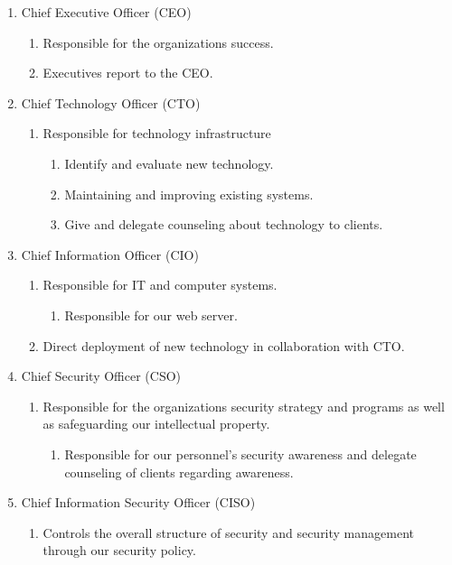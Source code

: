 \begin{enumerate}
  \item Chief Executive Officer (CEO)
   \begin{enumerate}
      \item Responsible for the organizations success.
      \item Executives report to the CEO.
  \end{enumerate}
  \item Chief Technology Officer (CTO)
   \begin{enumerate}
      \item Responsible for technology infrastructure
      \begin{enumerate}
        \item Identify and evaluate new technology.
        \item Maintaining and improving existing systems.
        \item Give and delegate counseling about technology to clients.
      \end{enumerate}
  \end{enumerate}
  \item Chief Information Officer (CIO)
   \begin{enumerate}
      \item Responsible for IT and computer systems.
      \begin{enumerate}
          \item Responsible for our web server.
      \end{enumerate}
      \item Direct deployment of new technology in collaboration with CTO.
  \end{enumerate}
  \item Chief Security Officer (CSO)
   \begin{enumerate}
      \item Responsible for the organizations security strategy and programs as well as safeguarding our intellectual property.
      \begin{enumerate}
          \item Responsible for our personnel's security awareness and delegate counseling of clients regarding awareness.
      \end{enumerate}
  \end{enumerate}
  \item Chief Information Security Officer (CISO)
  \begin{enumerate}
    \item Controls the overall structure of security and security management through our security policy.

\end{enumerate}
\end{enumerate}
